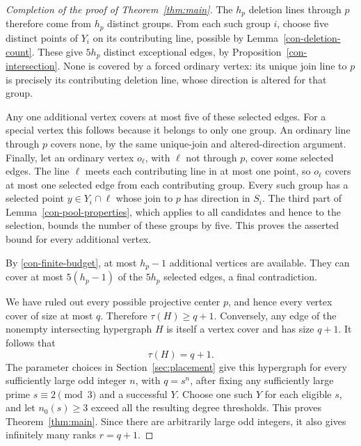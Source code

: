 \begin{proof}[Completion of the proof of Theorem~\ref{thm:main}]
The \(h_p\) deletion lines through \(p\) therefore come from
\(h_p\) distinct groups.  From each such group \(i\), choose five
distinct points of \(Y_i\) on its contributing line, possible by
Lemma~\ref{con-deletion-count}.  These give \(5h_p\) distinct
exceptional edges, by Proposition~\ref{con-intersection}.  None
is covered by a forced ordinary vertex: its unique join line to
\(p\) is precisely its contributing deletion line, whose
direction is altered for that group.

Any one additional vertex covers at most five of these selected
edges.  For a special vertex this follows because it belongs to
only one group.  An ordinary line through \(p\) covers none,
by the same unique-join and altered-direction argument.  Finally,
let an ordinary vertex \(o_\ell\), with \(\ell\) not through
\(p\), cover some selected edges.  The line \(\ell\) meets each
contributing line in at most one point, so \(o_\ell\) covers at most
one selected edge from each contributing group.  Every such group
has a selected point \(y\in Y_i\cap\ell\) whose join to \(p\)
has direction in \(S_i\).  The third part of
Lemma~\ref{con-pool-properties}, which applies to all candidates
and hence to the selection, bounds the number of these groups by
five.  This proves the asserted bound for every additional vertex.

By \eqref{con-finite-budget}, at most \(h_p-1\) additional
vertices are available.  They can cover at most \(5(h_p-1)\) of
the \(5h_p\) selected edges, a final contradiction.

We have ruled out every possible projective center \(p\), and
hence every vertex cover of size at most \(q\).  Therefore
\(\tau(H)\ge q+1\).  Conversely, any edge of the nonempty
intersecting hypergraph \(H\) is itself a vertex cover and has
size \(q+1\).  It follows that
\[
 \tau(H)=q+1.
\]
The parameter choices in Section~\ref{sec:placement} give this
hypergraph for every sufficiently large odd integer \(n\), with
\(q=s^n\), after fixing any sufficiently large prime
\(s\equiv2\pmod3\) and a successful \(Y\). Choose one such \(Y\)
for each eligible \(s\), and let \(n_0(s)\ge3\) exceed all the
resulting degree thresholds. This proves Theorem~\ref{thm:main}.
Since there are arbitrarily large odd integers, it also gives infinitely
many ranks \(r=q+1\).
\end{proof}
